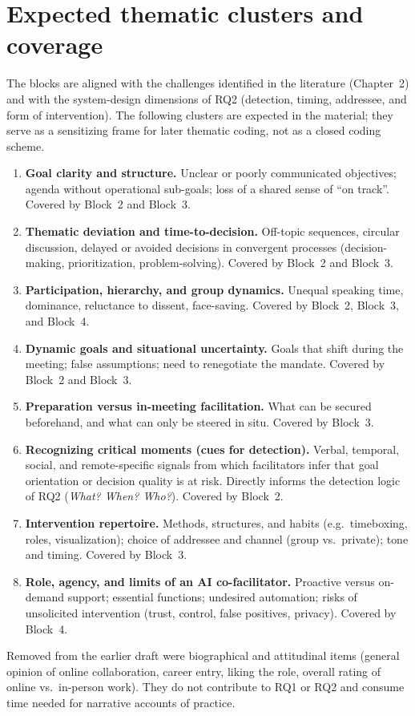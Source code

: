 \section{Expected thematic clusters and coverage}
\label{annex:expected-thematic-clusters}

The blocks are aligned with the challenges identified in the literature
(Chapter~2) and with the system-design dimensions of RQ2 (detection, timing, addressee,
and form of intervention). The following clusters are expected in the material; they serve as
a sensitizing frame for later thematic coding, not as a closed coding scheme.

\begin{enumerate}[label=\textbf{C\arabic*}]
  \item \textbf{Goal clarity and structure.}
    Unclear or poorly communicated objectives; agenda without operational sub-goals;
    loss of a shared sense of ``on track''.
    Covered by Block~2 and Block~3.
  \item \textbf{Thematic deviation and time-to-decision.}
    Off-topic sequences, circular discussion, delayed or avoided decisions in convergent
    processes (decision-making, prioritization, problem-solving).
    Covered by Block~2 and Block~3.
  \item \textbf{Participation, hierarchy, and group dynamics.}
    Unequal speaking time, dominance, reluctance to dissent, face-saving.
    Covered by Block~2, Block~3, and Block~4.
  \item \textbf{Dynamic goals and situational uncertainty.}
    Goals that shift during the meeting; false assumptions; need to renegotiate the mandate.
    Covered by Block~2 and Block~3.
  \item \textbf{Preparation versus in-meeting facilitation.}
    What can be secured beforehand, and what can only be steered in situ.
    Covered by Block~3.
  \item \textbf{Recognizing critical moments (cues for detection).}
    Verbal, temporal, social, and remote-specific signals from which facilitators infer
    that goal orientation or decision quality is at risk. Directly informs the detection
    logic of RQ2 (\textit{What? When? Who?}).
    Covered by Block~2.
  \item \textbf{Intervention repertoire.}
    Methods, structures, and habits (e.g.\ timeboxing, roles, visualization);
    choice of addressee and channel (group vs.\ private); tone and timing.
    Covered by Block~3.
  \item \textbf{Role, agency, and limits of an AI co-facilitator.}
    Proactive versus on-demand support; essential functions; undesired automation;
    risks of unsolicited intervention (trust, control, false positives, privacy).
    Covered by Block~4.
\end{enumerate}

Removed from the earlier draft were biographical and attitudinal items (general opinion of
  online collaboration, career entry, liking the role, overall rating of online vs.\ in-person
work). They do not contribute to RQ1 or RQ2 and consume time needed for narrative accounts
of practice.